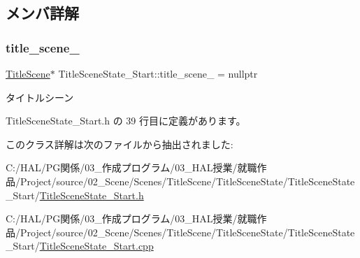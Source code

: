 \subsection{メンバ詳解}
\mbox{\label{class_title_scene_state___start_a1a0dde9e9834cb18e0cf1e1ab12a2129}} 
\subsubsection{\texorpdfstring{title\+\_\+scene\+\_\+}{title\_scene\_}}
{\footnotesize\ttfamily \mbox{\hyperlink{class_title_scene}{Title\+Scene}}$\ast$ Title\+Scene\+State\+\_\+\+Start\+::title\+\_\+scene\+\_\+ = nullptr\hspace{0.3cm}{\ttfamily [protected]}}



タイトルシーン 



 Title\+Scene\+State\+\_\+\+Start.\+h の 39 行目に定義があります。



このクラス詳解は次のファイルから抽出されました\+:\begin{DoxyCompactItemize}
\item 
C\+:/\+H\+A\+L/\+P\+G関係/03\+\_\+作成プログラム/03\+\_\+\+H\+A\+L授業/就職作品/\+Project/source/02\+\_\+\+Scene/\+Scenes/\+Title\+Scene/\+Title\+Scene\+State/\+Title\+Scene\+State\+\_\+\+Start/\mbox{\hyperlink{_title_scene_state___start_8h}{Title\+Scene\+State\+\_\+\+Start.\+h}}\item 
C\+:/\+H\+A\+L/\+P\+G関係/03\+\_\+作成プログラム/03\+\_\+\+H\+A\+L授業/就職作品/\+Project/source/02\+\_\+\+Scene/\+Scenes/\+Title\+Scene/\+Title\+Scene\+State/\+Title\+Scene\+State\+\_\+\+Start/\mbox{\hyperlink{_title_scene_state___start_8cpp}{Title\+Scene\+State\+\_\+\+Start.\+cpp}}\end{DoxyCompactItemize}

